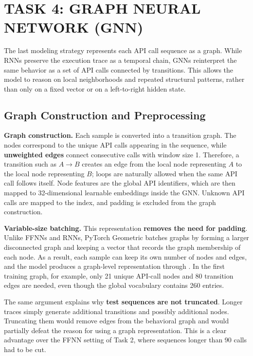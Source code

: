 
\section{TASK 4: GRAPH NEURAL NETWORK (GNN)} \label{sec:task4}

The last modeling strategy represents each API call sequence as a graph. While RNNs preserve the execution trace as a temporal chain, GNNs reinterpret the same behavior as a set of API calls connected by transitions. This allows the model to reason on local neighborhoods and repeated structural patterns, rather than only on a fixed vector or on a left-to-right hidden state.

\subsection{Graph Construction and Preprocessing} \label{subsec:task4_graph}

\textbf{Graph construction.} Each sample is converted into a transition graph. The nodes correspond to the unique API calls appearing in the sequence, while \textbf{unweighted edges} connect consecutive calls with window size 1. Therefore, a transition such as $A \rightarrow B$ creates an edge from the local node representing $A$ to the local node representing $B$; loops are naturally allowed when the same API call follows itself. Node features are the global API identifiers, which are then mapped to 32-dimensional learnable embeddings inside the GNN. Unknown API calls are mapped to the  index, and padding is excluded from the graph construction.

\textbf{Variable-size batching.} This representation \textbf{removes the need for padding}. Unlike FFNNs and RNNs, PyTorch Geometric batches graphs by forming a larger disconnected graph and keeping a  vector that records the graph membership of each node. As a result, each sample can keep its own number of nodes and edges, and the model produces a graph-level representation through . In the first training graph, for example, only 21 unique API-call nodes and 80 transition edges are needed, even though the global vocabulary contains 260 entries.

The same argument explains why \textbf{test sequences are not truncated}. Longer traces simply generate additional transitions and possibly additional nodes. Truncating them would remove edges from the behavioral graph and would partially defeat the reason for using a graph representation. This is a clear advantage over the FFNN setting of Task 2, where sequences longer than 90 calls had to be cut.

